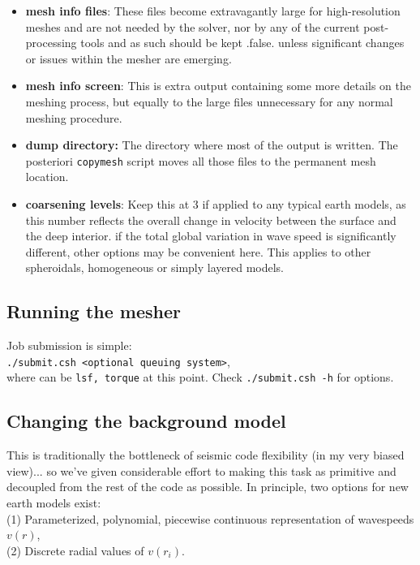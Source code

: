 \documentclass[11pt,letter,fleqn,english,notitlepage]{article}
\begin{document}
\begin{itemize}
\item \textbf{mesh info files}: These files become extravagantly large for high-resolution meshes 
and are not needed by the solver, nor by any of the current post-processing tools and as such should 
be kept .false. unless significant changes or issues within the mesher are emerging.

\item \textbf{mesh info screen}: This is extra output containing some more details on the meshing 
process, but equally to the large files unnecessary for any normal meshing procedure.

\item \textbf{dump directory:} The directory where most of the output is written. The posteriori 
{\tt copymesh} script moves all those files to the permanent mesh location.

\item \textbf{coarsening levels}: Keep this at 3 if applied to any typical earth models, as
this number reflects the overall change in velocity between the surface and the deep interior.
if the total global variation in wave speed is significantly different, 
other options may be convenient here. This applies to other spheroidals, homogeneous 
or simply layered models.
\end{itemize}

\subsection{Running the mesher}
Job submission is simple:\\
{\tt ./submit.csh <optional queuing system>},\\
where {\tt <optional queuing system>} can be {\tt lsf, torque} at this point. Check {\tt ./submit.csh -h} for 
options.

\subsection{Changing the background model}
This is traditionally the bottleneck of seismic code flexibility (in my very biased view)... so 
we've given considerable effort to making this task as primitive and decoupled from the 
rest of the code as possible. In principle, two options for new earth models exist: \\
(1) Parameterized, polynomial, piecewise continuous representation of wavespeeds $v(r)$,\\
(2) Discrete radial values of $v(r_i)$.\\
\end{document}
